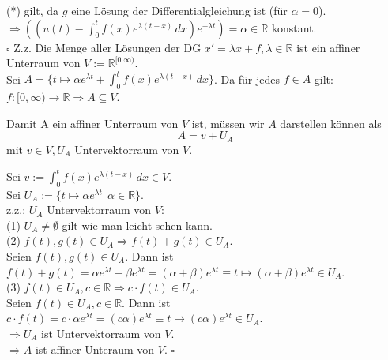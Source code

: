 \documentclass[11pt,a4paper,ngerman]{article}
\begin{document}
(*) gilt, da $g$ eine Lösung der Differentialgleichung ist (für $\alpha = 0$). \\

$ \Rightarrow \left( \left( u(t) - \int_0^t f(x)e^{\lambda (t-x)} \, dx \right) e^{-\lambda t} \right) = \alpha \in \mathbb{R}$ konstant. \\

\mbox{} \hfill $\square$
\newpage
Z.z. Die Menge aller Lösungen der DG $x' = \lambda x + f, \lambda \in \mathbb{R}$ ist ein affiner Unterraum von $V := \mathbb{R}^{[0.\infty)}$. \\


Sei $ A = \{ t \mapsto \alpha e^{\lambda t} + \int_0^t f(x)e^{\lambda (t-x)} \, dx \}$. Da für jedes $f \in A$ gilt: $f: [0,\infty) \to \mathbb{R} \Rightarrow A \subseteq V$.

Damit A ein affiner Unterraum von $V$ ist, müssen wir $A$ darstellen können als
$$ A = v + U_A $$
mit $v \in V, U_A$ Untervektorraum von $V$.

Sei $v := \int_0^t f(x)e^{\lambda (t-x)} \, dx \in V$.\\
Sei $U_A := \{ t \mapsto \alpha e^{\lambda t} | \, \alpha \in \mathbb{R} \}$.\\
z.z.: $U_A$ Untervektorraum von $V$:\\

(1) $U_A \neq \emptyset$ gilt wie man leicht sehen kann. \\
(2) $f(t), g(t) \in U_A \Rightarrow f(t)+g(t) \in U_A$. \\
Seien $f(t), g(t) \in U_A$. Dann ist $f(t) + g(t) = \alpha e^{\lambda t} + \beta e^{\lambda t} = (\alpha + \beta) e^{\lambda t} \equiv t \mapsto  (\alpha + \beta) e^{\lambda t} \in U_A$. \\
(3) $f(t) \in U_A, c \in \mathbb{R} \Rightarrow c \cdot f(t) \in U_A$. \\
Seien $f(t) \in U_A, c \in \mathbb{R}$. Dann ist $c \cdot f(t) = c \cdot \alpha e^{\lambda t} = (c \alpha)  e^{\lambda t} \equiv t \mapsto (c \alpha)  e^{\lambda t} \in U_A$.\\

$\Rightarrow U_A$ ist Untervektorraum von $V$. \\
$\Rightarrow A$ ist affiner Unteraum von $V$.
\mbox{} \hfill $\square$
\end{document}
